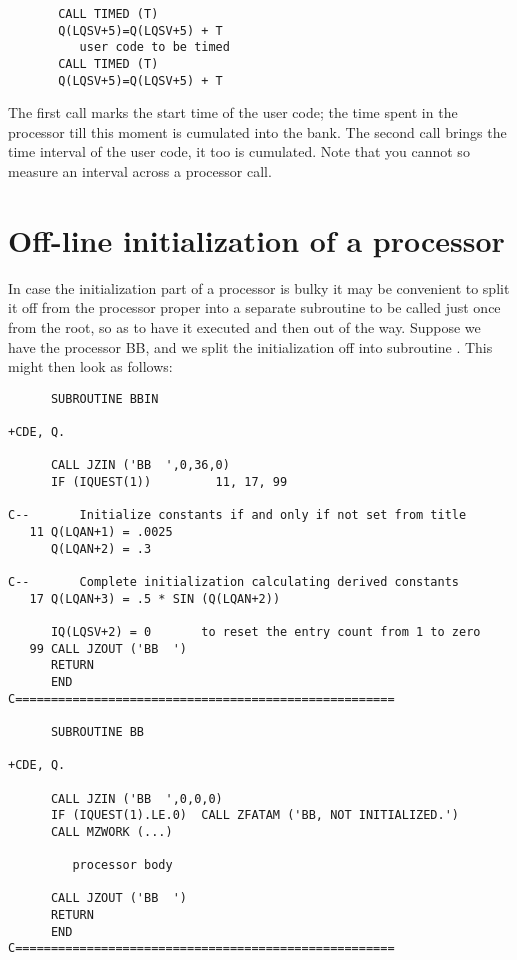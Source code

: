 \begin{verbatim}
       CALL TIMED (T)
       Q(LQSV+5)=Q(LQSV+5) + T
          user code to be timed
       CALL TIMED (T)
       Q(LQSV+5)=Q(LQSV+5) + T
\end{verbatim} 

The first call marks the start time of the user code;
the time spent in the processor till this moment
is cumulated into the  bank.
The second call brings the time interval of the user
code, it too is cumulated.
Note that you cannot so measure an interval
across a processor call.

\newpage
{}
\section{Off-line initialization of a processor}

In case the initialization part of a processor is bulky
it may be convenient to split it off from the processor proper
into a separate subroutine to be called just once from the root,
so as to have it executed and then out of the way.
Suppose we have the processor BB,
and we split the initialization off into subroutine .
This might then look as follows:

\begin{verbatim}
      SUBROUTINE BBIN

+CDE, Q.

      CALL JZIN ('BB  ',0,36,0)
      IF (IQUEST(1))         11, 17, 99

C--       Initialize constants if and only if not set from title
   11 Q(LQAN+1) = .0025
      Q(LQAN+2) = .3

C--       Complete initialization calculating derived constants
   17 Q(LQAN+3) = .5 * SIN (Q(LQAN+2))

      IQ(LQSV+2) = 0       to reset the entry count from 1 to zero
   99 CALL JZOUT ('BB  ')
      RETURN
      END
C=====================================================

      SUBROUTINE BB

+CDE, Q.

      CALL JZIN ('BB  ',0,0,0)
      IF (IQUEST(1).LE.0)  CALL ZFATAM ('BB, NOT INITIALIZED.')
      CALL MZWORK (...)

         processor body

      CALL JZOUT ('BB  ')
      RETURN
      END
C=====================================================
\end{verbatim} 

